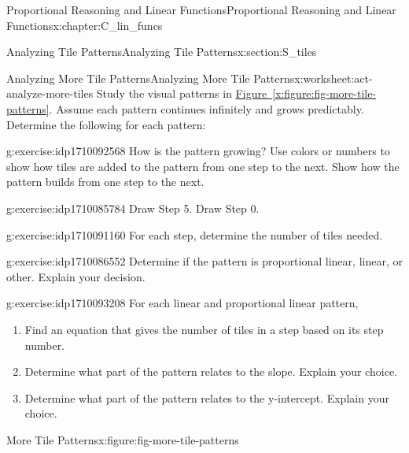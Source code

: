 \documentclass[oneside,10pt,]{book}
\newcommand{\xreffont}{\relax}
\numberwithin{equation}{chapter}
\begin{document}
\begin{chapterptx}{Proportional Reasoning and Linear Functions}{}{Proportional Reasoning and Linear Functions}{}{}{x:chapter:C_lin_funcs}
\begin{sectionptx}{Analyzing Tile Patterns}{}{Analyzing Tile Patterns}{}{}{x:section:S_tiles}
\begin{worksheet-subsection}{Analyzing More Tile Patterns}{}{Analyzing More Tile Patterns}{}{}{x:worksheet:act-analyze-more-tiles}
Study the visual patterns in \hyperref[x:figure:fig-more-tile-patterns]{Figure~{\xreffont\ref{x:figure:fig-more-tile-patterns}}}. Assume each pattern continues infinitely and grows predictably. Determine the following for each pattern:%
\begin{divisionexercise}{1}{}{}{g:exercise:idp1710092568}%
How is the pattern growing? Use colors or numbers to show how tiles are added to the pattern from one step to the next. Show how the pattern builds from one step to the next.%
\end{divisionexercise}%
\begin{divisionexercise}{2}{}{}{g:exercise:idp1710085784}%
Draw Step 5. Draw Step 0.%
\end{divisionexercise}%
\begin{divisionexercise}{3}{}{}{g:exercise:idp1710091160}%
For each step, determine the number of tiles needed.%
\end{divisionexercise}%
\begin{divisionexercise}{4}{}{}{g:exercise:idp1710086552}%
Determine if the pattern is proportional linear, linear, or other. Explain your decision.%
\end{divisionexercise}%
\begin{divisionexercise}{5}{}{}{g:exercise:idp1710093208}%
For each linear and proportional linear pattern,%
\begin{enumerate}[font=\bfseries,label=(\alph*),ref=\alph*]
\item{}Find an equation that gives the number of tiles in a step based on its step number.%
\item{}Determine what part of the pattern relates to the slope. Explain your choice.%
\item{}Determine what part of the pattern relates to the y-intercept. Explain your choice.%
\end{enumerate}
\end{divisionexercise}%
\clearpage
\begin{figureptx}{More Tile Patterns}{x:figure:fig-more-tile-patterns}{}%
\begin{image}{0.1}{0.8}{0.1}%

\end{image}
\end{figureptx}
\end{worksheet-subsection}
\end{sectionptx}
\end{chapterptx}
\end{document}
